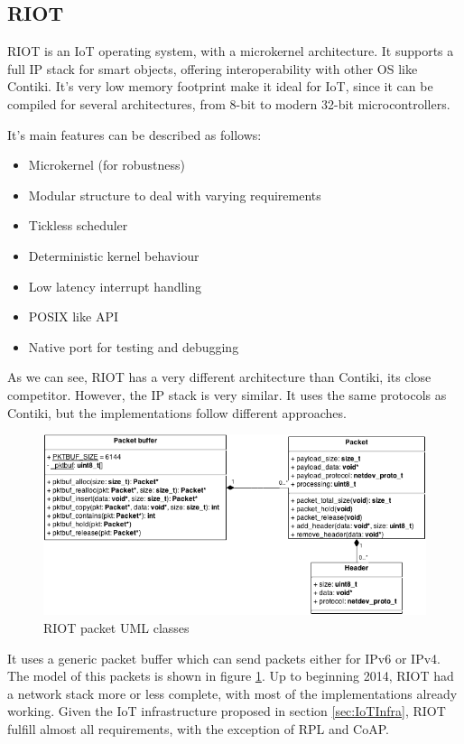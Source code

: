 \subsection{RIOT}
RIOT is an IoT operating system\cite{baccelli2013riot}, with a microkernel architecture.
It supports a full IP stack for smart objects, offering interoperability with other OS like Contiki.
It's very low memory footprint make it ideal for IoT, since it can be compiled for several architectures, from 8-bit to modern 32-bit microcontrollers.

It's main features can be described as follows:

\begin{itemize}
	\item Microkernel (for robustness)
	\item Modular structure to deal with varying requirements
	\item Tickless scheduler
	\item Deterministic kernel behaviour
	\item Low latency interrupt handling
	\item POSIX like API
	\item Native port for testing and debugging
\end{itemize}

As we can see, RIOT has a very different architecture than Contiki, its close competitor.
However, the IP stack is very similar.
It uses the same protocols as Contiki, but the implementations follow different approaches.

\begin{figure}[htb]
	\centering
	\includegraphics[width=1\columnwidth]{chapters/background.images/pktbuf-uml-class.png}
	\caption{RIOT packet UML classes}
	\label{fig:RIOTpktBuf}
\end{figure}

It uses a generic packet buffer which can send packets either for IPv6 or IPv4.
The model of this packets is shown in figure \ref{fig:RIOTpktBuf}.
Up to beginning 2014, RIOT had a network stack more or less complete, with most of the implementations already working.
Given the IoT infrastructure proposed in section \ref{sec:IoTInfra}, RIOT fulfill almost all requirements, with the exception of RPL and CoAP.

